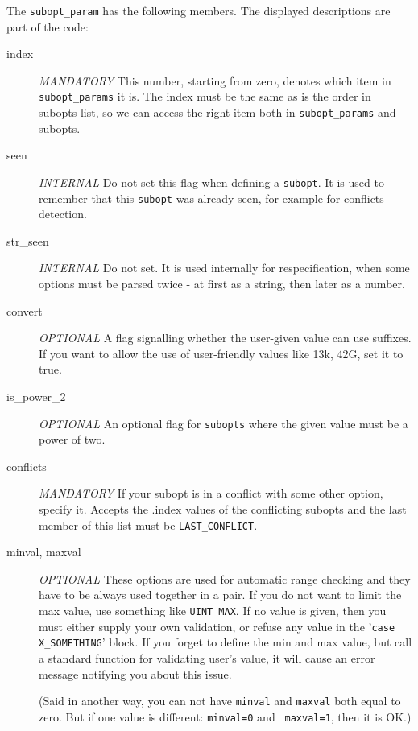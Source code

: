 The {\tt subopt\_param} has the following members. The displayed
descriptions are part of the code:
\begin{description}
\item[index] {\em MANDATORY}
	This number, starting from zero, denotes which item in {\tt subopt\_params}
    it is. The index must be the same as is the order in subopts list,
    so we can access the right item both in {\tt subopt\_params} and subopts.

\item[seen] {\em INTERNAL}
	Do not set this flag when defining a {\tt subopt}. It is used to remember that
	this {\tt subopt} was already seen, for example for conflicts detection.

\item[str\_seen] {\em INTERNAL}
    Do not set. It is used internally for respecification, when some options
    must be parsed twice - at first as a string, then later as a number.

\item[convert] {\em OPTIONAL}
    A flag signalling whether the user-given value can use suffixes.
    If you want to allow the use of user-friendly values like 13k, 42G,
    set it to true.

\item[is\_power\_2] {\em OPTIONAL}
	An optional flag for {\tt subopts} where the given value must be a power
    of two.

\item[conflicts] {\em MANDATORY}
    If your subopt is in a conflict with some other option, specify it.
    Accepts the .index values of the conflicting subopts and the last
    member of this list must be {\tt LAST\_CONFLICT}.

\item[minval, maxval] {\em OPTIONAL}
    These options are used for automatic range checking and they have to be
    always used together in a pair. If you do not want to limit the max value,
    use something like {\tt UINT\_MAX}. If no value is given, then you must either
    supply your own validation, or refuse any value in the '{\tt case
    X\_SOMETHING}' block. If you forget to define the min and max value, but
    call a standard function for validating user's value, it will cause an
    error message notifying you about this issue.

    (Said in another way, you can not have {\tt minval} and {\tt maxval} both equal
	    to zero. But if one value is different: {\tt minval=0} and {\tt
	    maxval=1},
    then it is OK.)


\end{description}
